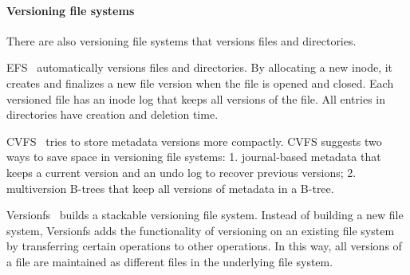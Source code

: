 \paragraph{Versioning file systems}

There are also versioning file systems that versions files and directories.

EFS~\citep{efs} automatically versions files and directories.
By allocating a new inode, it creates and finalizes a new file version when the
file is opened and closed.
Each versioned file has an inode log that keeps all versions of the file.
All entries in directories have creation and deletion time.

CVFS~\citep{cvfs} tries to store metadata versions more compactly.
CVFS suggests two ways to save space in versioning file systems:
1. journal-based metadata that keeps a current version and an undo log to
recover previous versions;
2. multiversion B-trees that keep all versions of metadata in a B-tree.

Versionfs~\citep{versionfs} builds a stackable versioning file system.
Instead of building a new file system, Versionfs adds the functionality of
versioning on an existing file system by transferring certain operations to
other operations.
In this way, all versions of a file are maintained as different files in the
underlying file system.
